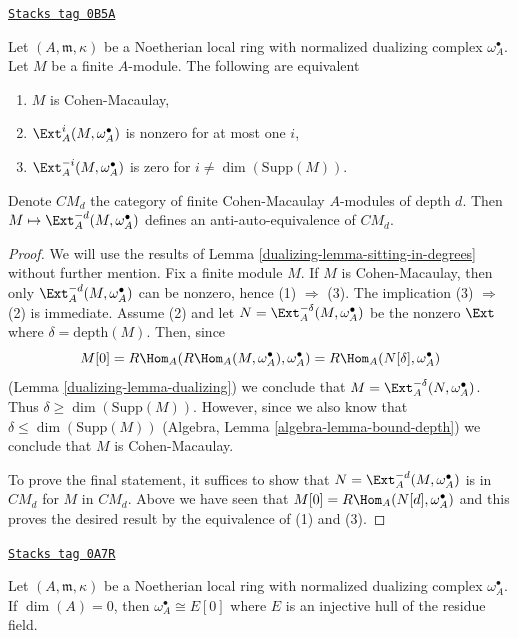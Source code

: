 \begin{lemma}[Local CM]
\label{dualizing-lemma-local-CM}
\href{https://stacks.math.columbia.edu/tag/0B5A}{\texttt{Stacks tag 0B5A}}

Let $(A, \mathfrak m, \kappa)$ be a Noetherian local ring
with normalized dualizing complex $\omega_A^\bullet$. Let $M$
be a finite $A$-module. The following are equivalent
\begin{enumerate}
\item $M$ is Cohen-Macaulay,
\item $\Ext^i_A(M, \omega_A^\bullet)$ is nonzero for at most one $i$,
\item $\Ext^{-i}_A(M, \omega_A^\bullet)$ is zero for
$i \not = \dim(\text{Supp}(M))$.
\end{enumerate}
Denote $CM_d$ the category of finite Cohen-Macaulay $A$-modules
of depth $d$. Then $M \mapsto \Ext^{-d}_A(M, \omega_A^\bullet)$
defines an anti-auto-equivalence of $CM_d$.
\end{lemma}

\begin{proof}

We will use the results of Lemma \ref{dualizing-lemma-sitting-in-degrees}
without further mention. Fix a finite module $M$.
If $M$ is Cohen-Macaulay, then only
$\Ext^{-d}_A(M, \omega_A^\bullet)$ can be nonzero,
hence (1) $\Rightarrow$ (3).
The implication (3) $\Rightarrow$ (2) is immediate.
Assume (2) and let $N = \Ext^{-\delta}_A(M, \omega_A^\bullet)$
be the nonzero $\Ext$ where $\delta = \text{depth}(M)$. Then, since
$$
M[0] = R\Hom_A(R\Hom_A(M, \omega_A^\bullet), \omega_A^\bullet) =
R\Hom_A(N[\delta], \omega_A^\bullet)
$$
(Lemma \ref{dualizing-lemma-dualizing})
we conclude that $M = \Ext_A^{-\delta}(N, \omega_A^\bullet)$.
Thus $\delta \geq \dim(\text{Supp}(M))$. However,
since we also know that $\delta \leq \dim(\text{Supp}(M))$
(Algebra, Lemma \ref{algebra-lemma-bound-depth}) we conclude that $M$ is
Cohen-Macaulay.

\medskip\noindent
To prove the final statement, it suffices to show that
$N = \Ext^{-d}_A(M, \omega_A^\bullet)$ is in $CM_d$
for $M$ in $CM_d$. Above we have seen that
$M[0] = R\Hom_A(N[d], \omega_A^\bullet)$ and this proves the
desired result by the equivalence of (1) and (3).
\end{proof}

\begin{lemma}
\label{dualizing-lemma-dualizing-artinian}
\href{https://stacks.math.columbia.edu/tag/0A7R}{\texttt{Stacks tag 0A7R}}

Let $(A, \mathfrak m, \kappa)$ be a Noetherian local
ring with normalized dualizing complex $\omega_A^\bullet$.
If $\dim(A) = 0$, then $\omega_A^\bullet \cong E[0]$
where $E$ is an injective hull of the residue field.
\end{lemma}


